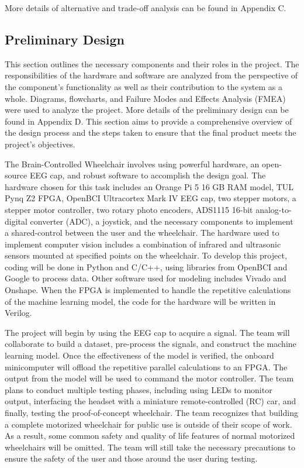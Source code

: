 \documentclass[conference]{IEEEtran}
\begin{document}
    More details of alternative and trade-off analysis can be found in Appendix C. 

    \subsection{Preliminary Design}
    This section outlines the necessary components and their roles in the project. The responsibilities of the hardware and software are analyzed from the perspective of the component's functionality as well as their contribution to the system as a whole. Diagrams, flowcharts, and Failure Modes and Effects Analysis (FMEA) were used to analyze the project. More details of the preliminary design can be found in Appendix D. This section aims to provide a comprehensive overview of the design process and the steps taken to ensure that the final product meets the project's objectives.
    
    The Brain-Controlled Wheelchair involves using powerful hardware, an open-source EEG cap, and robust software to accomplish the design goal. The hardware chosen for this task includes an Orange Pi 5 16 GB RAM model, TUL Pynq Z2 FPGA, OpenBCI Ultracortex Mark IV EEG cap, two stepper motors, a stepper motor controller, two rotary photo encoders, ADS1115 16-bit analog-to-digital converter (ADC), a joystick, and the necessary components to implement a shared-control between the user and the wheelchair. The hardware used to implement computer vision includes a combination of infrared and ultrasonic sensors mounted at specified points on the wheelchair. To develop this project, coding will be done in Python and C/C++, using libraries from OpenBCI and Google to process data. Other software used for modeling includes Vivado and Onshape. When the FPGA is implemented to handle the repetitive calculations of the machine learning model, the code for the hardware will be written in Verilog.

    The project will begin by using the EEG cap to acquire a signal. The team will collaborate to build a dataset, pre-process the signals, and construct the machine learning model. Once the effectiveness of the model is verified, the onboard minicomputer will offload the repetitive parallel calculations to an FPGA. The output from the model will be used to command the motor controller. The team plans to conduct multiple testing phases, including using LEDs to monitor output, interfacing the headset with a miniature remote-controlled (RC) car, and finally, testing the proof-of-concept wheelchair. The team recognizes that building a complete motorized wheelchair for public use is outside of their scope of work. As a result, some common safety and quality of life features of normal motorized wheelchairs will be omitted. The team will still take the necessary precautions to ensure the safety of the user and those around the user during testing. 
\end{document}
